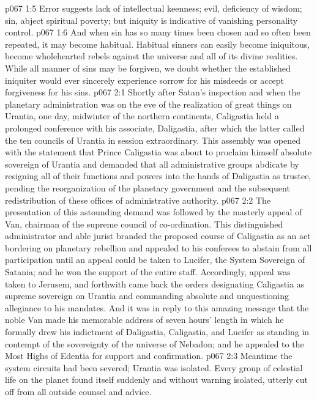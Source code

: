 \vs p067 1:5 Error suggests lack of intellectual keenness; evil, deficiency of wisdom; sin, abject spiritual poverty; but iniquity is indicative of vanishing personality control.
\vs p067 1:6 And when sin has so many times been chosen and so often been repeated, it may become habitual. Habitual sinners can easily become iniquitous, become wholehearted rebels against the universe and all of its divine realities. While all manner of sins may be forgiven, we doubt whether the established iniquiter would ever sincerely experience sorrow for his misdeeds or accept forgiveness for his sins.
\vs p067 2:1 Shortly after Satan’s inspection and when the planetary administration was on the eve of the realization of great things on Urantia, one day, midwinter of the northern continents, Caligastia held a prolonged conference with his associate, Daligastia, after which the latter called the ten councils of Urantia in session extraordinary. This assembly was opened with the statement that Prince Caligastia was about to proclaim himself absolute sovereign of Urantia and demanded that all administrative groups abdicate by resigning all of their functions and powers into the hands of Daligastia as trustee, pending the reorganization of the planetary government and the subsequent redistribution of these offices of administrative authority.
\vs p067 2:2 The presentation of this astounding demand was followed by the masterly appeal of Van, chairman of the supreme council of co\hyp{}ordination. This distinguished administrator and able jurist branded the proposed course of Caligastia as an act bordering on planetary rebellion and appealed to his conferees to abstain from all participation until an appeal could be taken to Lucifer, the System Sovereign of Satania; and he won the support of the entire staff. Accordingly, appeal was taken to Jerusem, and forthwith came back the orders designating Caligastia as supreme sovereign on Urantia and commanding absolute and unquestioning allegiance to his mandates. And it was in reply to this amazing message that the noble Van made his memorable address of seven hours’ length in which he formally drew his indictment of Daligastia, Caligastia, and Lucifer as standing in contempt of the sovereignty of the universe of Nebadon; and he appealed to the Most Highs of Edentia for support and confirmation.
\vs p067 2:3 \pc Meantime the system circuits had been severed; Urantia was isolated. Every group of celestial life on the planet found itself suddenly and without warning isolated, utterly cut off from all outside counsel and advice.
